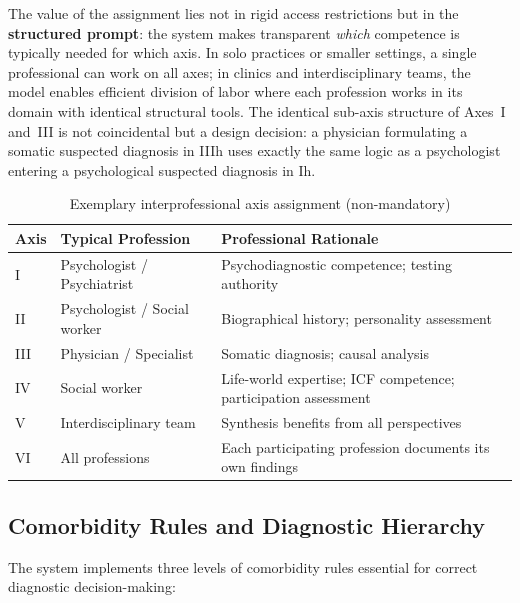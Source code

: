 \documentclass[11pt,a4paper]{article}
\begin{document}
The value of the assignment lies not in rigid access restrictions but in the \textbf{structured prompt}: the system makes transparent \textit{which} competence is typically needed for which axis. In solo practices or smaller settings, a single professional can work on all axes; in clinics and interdisciplinary teams, the model enables efficient division of labor where each profession works in its domain with identical structural tools. The identical sub-axis structure of Axes~I and~III is not coincidental but a design decision: a physician formulating a somatic suspected diagnosis in IIIh uses exactly the same logic as a psychologist entering a psychological suspected diagnosis in Ih.

\begin{table}[H]
\centering
\caption{Exemplary interprofessional axis assignment (non-mandatory)}
\label{tab:professions}
\begin{tabularx}{\textwidth}{lXX}
\toprule
\textbf{Axis} & \textbf{Typical Profession} & \textbf{Professional Rationale} \\
\midrule
I & Psychologist / Psychiatrist & Psychodiagnostic competence; testing authority \\
\addlinespace
II & Psychologist / Social worker & Biographical history; personality assessment \\
\addlinespace
III & Physician / Specialist & Somatic diagnosis; causal analysis \\
\addlinespace
IV & Social worker & Life-world expertise; ICF competence; participation assessment \\
\addlinespace
V & Interdisciplinary team & Synthesis benefits from all perspectives \\
\addlinespace
VI & All professions & Each participating profession documents its own findings \\
\bottomrule
\end{tabularx}
\end{table}

\subsection{Comorbidity Rules and Diagnostic Hierarchy}
\label{sec:comorbidity}

The system implements three levels of comorbidity rules essential for correct diagnostic decision-making:
\end{document}
